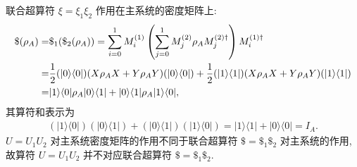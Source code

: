 \documentclass{assignment}
\begin{document}
\begin{sol}
\begin{itemize}
        联合超算符 $\xi=\xi_1\xi_2$ 作用在主系统的密度矩阵上:
        \begin{align}
            \notag\$(\rho_A)=&\$_1(\$_2(\rho_A))=\sum_{i=0}^1M_i^{(1)}\left(\sum_{j=0}^1M_j^{(2)}\rho_AM_j^{(2)\dagger}\right)M_i^{(1)\dagger}\\
            \notag=&\frac{1}{2}(\lvert 0\rangle\langle 0\rvert)(X\rho_AX+Y\rho_AY)(\lvert 0\rangle\langle 0\rvert)+\frac{1}{2}(\lvert 1\rangle\langle 1\rvert)(X\rho_AX+Y\rho_AY)(\lvert 1\rangle\langle 1\rvert)\\
            =&\lvert 1\rangle\langle 0\rvert\rho_A\lvert 0\rangle\langle 1\rvert+\lvert 0\rangle\langle 1\rvert\rho_A\lvert 1\rangle\langle 0\rvert,
        \end{align}
        其算符和表示为
        \begin{align}
            (\lvert 1\rangle\langle 0\rvert)(\lvert 0\rangle\langle 1\rvert)+(\lvert 0\rangle\langle 1\rvert)(\lvert 1\rangle\langle 0\rvert)=\lvert 1\rangle\langle 1\rvert+\lvert 0\rangle\langle 0\rvert=I_A.
        \end{align}
        $U=U_1U_2$ 对主系统密度矩阵的作用不同于联合超算符 $\$=\$_1\$_2$ 对主系统的作用, 故算符 $U=U_1U_2$ 并不对应联合超算符 $\$=\$_1\$_2$.
    \end{itemize}
\end{sol}
\end{document}
